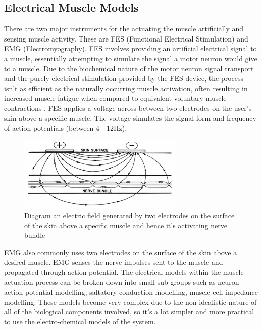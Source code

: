 \subsection{Electrical Muscle Models}
There are two major instruments for the actuating the muscle artificially and sensing muscle activity. These are FES (Functional Electrical Stimulation) and EMG (Electromyography). FES involves providing an artificial electrical signal to a muscle, essentially attempting to simulate the signal a motor neuron would give to a muscle. Due to the biochemical nature of the motor neuron signal transport and the purely electrical stimulation provided by the FES device, the process isn't as efficient as the naturally occurring muscle activation, often resulting in increased muscle fatigue when compared to equivalent voluntary muscle contractions \citep{Ibitoye2016}. FES applies a voltage across between two electrodes on the user's skin above a specific muscle. The voltage simulates the signal form and frequency of action potentials (between 4 - 12Hz\citep{Popovic2004}).
\begin{figure}[h!]
  \centering
  \includegraphics[width=8cm]{Figures/FES_electric_field.PNG}
  \caption{Diagram an electric field generated by two electrodes on the surface of the skin above a specific muscle and hence it's activating nerve bundle\citep{Bajd2010}}
  \label{fig:Muscle}
\end{figure}
EMG also commonly uses two electrodes on the surface of the skin above a desired muscle. EMG senses the nerve impulses sent to the muscle and propagated through action potential. The electrical models within the muscle actuation process can be broken down into small sub groups such as neuron action potential modelling, saltatory conduction modelling, muscle cell impedance modelling. These models become very complex due to the non idealistic nature of all of the biological components involved, so it's a lot simpler and more practical to use the electro-chemical models of the system.


